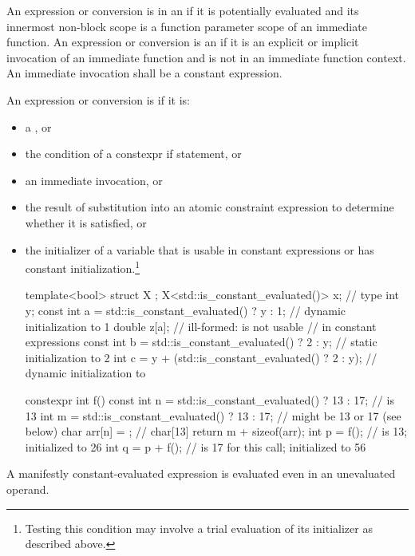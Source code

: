 \pnum
An expression or conversion is in an 
if it is potentially evaluated and
its innermost non-block scope is
a function parameter scope of an immediate function.
An expression or conversion is an 
if it is an explicit or implicit invocation of an immediate function and
is not in an immediate function context.
An immediate invocation shall be a constant expression.

\pnum
An expression or conversion  is 
if it is:
\begin{itemize}
\item a , or
\item the condition of a constexpr if statement, or
\item an immediate invocation, or
\item the result of substitution into an atomic constraint expression
to determine whether it is satisfied, or
\item the initializer of a variable
that is usable in constant expressions or
has constant initialization.\footnote{Testing this condition
may involve a trial evaluation of its initializer as described above.}
\begin{example}
\begin{codeblock}
template<bool> struct X {};
X<std::is_constant_evaluated()> x;                      // type 
int y;
const int a = std::is_constant_evaluated() ? y : 1;     // dynamic initialization to 1
double z[a];                                            // ill-formed:  is not usable
                                                        // in constant expressions
const int b = std::is_constant_evaluated() ? 2 : y;     // static initialization to 2
int c = y + (std::is_constant_evaluated() ? 2 : y);     // dynamic initialization to 

constexpr int f() {
  const int n = std::is_constant_evaluated() ? 13 : 17; //  is 13
  int m = std::is_constant_evaluated() ? 13 : 17;       //  might be 13 or 17 (see below)
  char arr[n] = {}; // char[13]
  return m + sizeof(arr);
}
int p = f();                                            //  is 13; initialized to 26
int q = p + f();                                        //  is 17 for this call; initialized to 56
\end{codeblock}
\end{example}
\end{itemize}
\begin{note}
A manifestly constant-evaluated expression
is evaluated even in an unevaluated operand.
\end{note}


